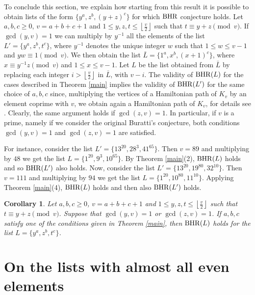 \documentclass{amsart}
\newtheorem{cor}[prop]{Corollary}
\theoremstyle{definition}
\numberwithin{equation}{section}
\def\BHR{\mathop{\rm BHR}}
\begin{document}
To conclude this section, we explain how starting from this result it is possible to obtain
lists of the form $\{y^a,z^b,(y+z)^c\}$ for which $\BHR$ conjecture holds.
Let $a,b,c\geq 0$, $v=a+b+c+1$ and $1\leq y,z,t\leq \left \lfloor \frac{v}{2}\right\rfloor$
such that $t\equiv y+z\pmod v$. If $\gcd(y,v)=1$ we can multiply by $y^{-1}$ all the elements
of the list $L'=\{y^a,z^b,t^c\}$, where $y^{-1}$ denotes the unique integer $w$ such that $1\leq w \leq v-1$
and $yw\equiv 1\pmod v$. We then obtain the list $\bar{L}=\{1^a,x^b,(x+1)^c\}$, where $x\equiv y^{-1}z\pmod v$ and $1\leq x \leq v-1$.
Let $L$ be the list obtained from $\bar{L}$ by replacing each integer $i> \left \lfloor \frac{v}{2}\right\rfloor$ in
$\bar{L}$,
with $v-i$.
The validity of $\BHR(L)$ for the cases described in Theorem \ref{main} implies the validity of $\BHR(L')$
for the same choice of $a,b,c$ since, multiplying the vertices of a Hamiltonian path of $K_v$ by an element coprime with
$v$, we obtain again a Hamiltonian path of $K_v$, for details see \cite[Lemma 2]{DJ}.
Clearly, the same argument holds if $\gcd(z,v)=1$.
In particular, if $v$ is a prime, namely if we consider the original Buratti's conjecture,
both conditions $\gcd(y,v)=1$ and $\gcd(z,v)=1$ are satisfied.

For instance, consider the list $L'=\{13^{20}, 28^{3}, 41^{65} \}$.
Then $v=89$ and multiplying by $48$ we get the list
$L=\{1^{20}, 9^{3}, 10^{65}\}$.
By Theorem \ref{main}(2), $\BHR(L)$ holds and so  $\BHR(L')$ also holds.
Now,  consider the list $L'=\{13^{20}, 19^{80}, 32^{10} \}$.
Then $v=111$ and multiplying by $94$ we get the list
$L=\{1^{20}, 10^{80}, 11^{10}\}$.
Applying Theorem \ref{main}(4), $\BHR(L)$ holds and then also $\BHR(L')$ holds.



\begin{cor}
Let $a,b,c\geq 0$, $v=a+b+c+1$ and $1\leq y,z,t\leq \left \lfloor \frac{v}{2}\right\rfloor$
such that $t\equiv y+z\pmod v$. Suppose that $\gcd(y,v)=1$ or $\gcd(z,v)=1$.
If $a,b,c$ satisfy one of the conditions given in Theorem \rm{\ref{main}}, then $\BHR(L)$ holds for the
list $L=\{y^a,z^b,t^c\}$.
\end{cor}





\section{On the lists with almost all even elements}\label{sec:other}
\end{document}
